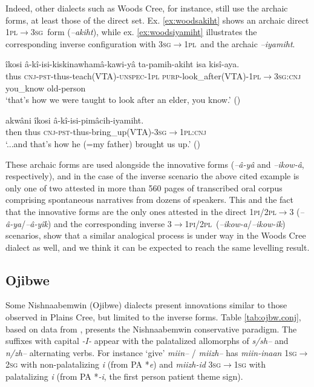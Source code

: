 \documentclass[twoside,a4paper,11pt]{article}
\newcommand{\ipa}[1]{{\phon\textit{#1}}}
\newcommand{\sg}{\textsc{sg}}
\newcommand{\pl}{\textsc{pl}}
\newcommand{\Σ}{\greek{Σ}}
\newcommand{\cnj}{\textsc{cnj}}
\newcommand{\pli}{\textsc{pi}}
\newcommand{\pst}{\textsc{pst}}
\newcommand{\purp}{\textsc{purp}}
\newcommand{\unspec}{\textsc{unspec}}
\begin{document}
Indeed, other dialects such as Woods Cree, for instance, still use the archaic forms, at least those of the direct set. Ex. \ref{ex:woodsakiht} shows an archaic direct 1\pl$\rightarrow$3\sg\ form (\ipa{--akiht}), while ex. \ref{ex:woodsiyamiht} illustrates the corresponding inverse configuration with 3\sg$\rightarrow$1\pl\ and the archaic \ipa{--iyamiht}.

\begin{exe}
\ex \label{ex:woodsakiht}
 \gll îkosi â-kî-isi-kiskinawhamâ-kawi-yâ ta-pamih-akiht isa kisî-aya.\\
thus {\cnj-\pst-thus-teach(VTA)-\unspec-1\pl} {\purp-look\_after(VTA)-1\pl$\rightarrow$3\sg:\cnj} {you\_know} {old-person}\\
\glt `that's how we were taught to look after an elder, you know.' (\citealp[p. 275]{castel})
\end{exe}

\begin{exe}
\ex \label{ex:woodsiyamiht}
 \gll akwâni îkosi â-kî-isi-pimâcih-iyamiht.\\
then thus \cnj-\pst-thus-bring\_up(VTA)-3\sg$\rightarrow$1\pl:\cnj\\
\glt `...and that's how he (=my father)  brought us up.' (\citealp[p. 182]{castel})
\end{exe}

These archaic forms are used alongside the innovative forms (\ipa{--â-yâ} and \ipa{--ikow-â}, respectively), and in the case of the inverse scenario the above cited example is only one of two attested in more than 560 pages of transcribed oral corpus comprising spontaneous narratives from dozens of speakers. This and the fact that the innovative forms are the only ones attested in the direct 1\pli/2\pl$\rightarrow$3 (\ipa{--â-ya}/\ipa{--â-yîk}) and the corresponding inverse 3$\rightarrow$1\pli/2\pl\ (\ipa{--ikow-a}/\ipa{--ikow-îk}) scenarios, show that a similar analogical process is under way in the Woods Cree dialect as well, and we think it can be expected to reach the same levelling result.


\subsection{Ojibwe} \label{subsec:ojibwe}
Some Nishnaabemwin (Ojibwe) dialects  present innovations similar to those observed in Plains Cree, but limited to the inverse forms. Table \ref{tab:ojbw.conj}, based on data from \citet[295]{valentine01grammar}, presents the Nishnaabemwin conservative paradigm. The suffixes with capital \ipa{-I-} appear with the palatalized allomorphs of \ipa{s/sh--} and \ipa{n/zh--} alternating verbs. For instance `give' \ipa{miin--} / \ipa{miizh--} has \ipa{miin-inaan} 1\sg{}$\rightarrow$2\sg{} with non-palatalizing \ipa{i} (from PA *\ipa{e}) and \ipa{miizh-id} 3\sg{}$\rightarrow$1\sg{} with palatalizing \ipa{i} (from PA *\ipa{-i}, the first person patient theme sign).
\end{document}
